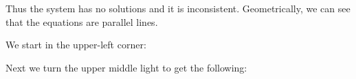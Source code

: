 \begin{enumerate}
Thus the system has no solutions and it is inconsistent. Geometrically, we can see that the equations are parallel lines.

  
  \Answer We start in the upper-left corner:   
   \begin{center}
\begin{chaossudoku}[rows=3,columns=3]
    \begin{puzzlebackground}



    \end{puzzlebackground}
  \end{chaossudoku}
\end{center}
Next we turn the upper middle light to get the following:
   \begin{center}
\begin{chaossudoku}[rows=3,columns=3]
    \begin{puzzlebackground}




    \end{puzzlebackground}
  \end{chaossudoku}
\end{center}


\end{enumerate}
